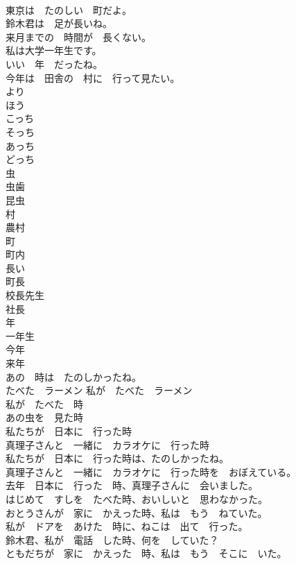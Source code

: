 \documentclass[8pt]{extreport}
\begin{document}
\begin{CJK}{UTF8}{min}
\\	東京は　たのしい　町だよ。	
\\	鈴木君は　足が長いね。	
\\	来月までの　時間が　長くない。	
\\	私は大学一年生です。	
\\	いい　年　だったね。	
\\	今年は　田舎の　村に　行って見たい。	
\\	より	
\\	ほう	
\\	こっち	
\\	そっち	
\\	あっち	
\\	どっち	
\\	虫	
\\	虫歯	
\\	昆虫	
\\	村	
\\	農村	
\\	町	
\\	町内	
\\	長い	
\\	町長	
\\	校長先生	
\\	社長	
\\	年	
\\	一年生	
\\	今年	
\\	来年	
\\	あの　時は　たのしかったね。	
\\	たべた　ラーメン 私が　たべた　ラーメン	
\\	私が　たべた　時	
\\	あの虫を　見た時	
\\	私たちが　日本に　行った時	
\\	真理子さんと　一緒に　カラオケに　行った時	
\\	私たちが　日本に　行った時は、たのしかったね。	
\\	真理子さんと　一緒に　カラオケに　行った時を　おぼえている。	
\\	去年　日本に　行った　時、真理子さんに　会いました。	
\\	はじめて　すしを　たべた時、おいしいと　思わなかった。	
\\	おとうさんが　家に　かえった時、私は　もう　ねていた。	
\\	私が　ドアを　あけた　時に、ねこは　出て　行った。	
\\	鈴木君、私が　電話　した時、何を　していた？	
\\	ともだちが　家に　かえった　時、私は　もう　そこに　いた。	

\end{CJK}
\end{document}
